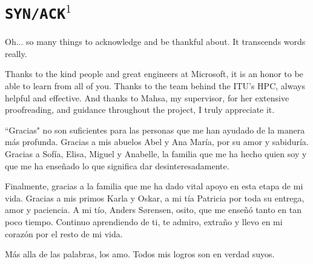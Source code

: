 \documentclass{thesis/resources/ituthesis}
\begin{document}
\frontmatter

\thetitlepage
\newpage
\chapter{\texttt{SYN/ACK}$^1$}

\parbox{0.8\textwidth}{
Oh... so many things to acknowledge and be thankful about. It transcends words really.

Thanks to the kind people and great engineers at Microsoft, it is an honor to be able to learn
from all of you. Thanks to the team behind the ITU's HPC, always helpful and effective. 
And thanks to Mahsa, my supervisor, for her extensive proofreading, and guidance throughout 
the project, I truly appreciate it. 
}

\vspace{3.5cm}

\parbox{\textwidth}{
    \begin{flushright}
``Gracias" no son suficientes para las personas que me han ayudado de la manera 
m\'as profunda. Gracias a mis abuelos Abel y Ana Mar\'ia, por su amor y sabidur\'ia.
Gracias a Sof\'ia, Elisa, Miguel y Anabelle, la familia que me ha hecho quien soy y 
que me ha ense\~nado lo que significa dar desinteresadamente. 

Finalmente, gracias a la familia que me ha dado vital apoyo en esta etapa de mi vida. Gracias a 
mis primos Karla y Oskar, a mi t\'ia Patricia por toda su entrega, amor y paciencia. A mi t\'io, Anders S\o{}rensen, 
osito, que me ense\~n\'o tanto en tan poco tiempo. Continuo aprendiendo de ti, te admiro, extra\~no 
y llevo en mi coraz\'on por el resto de mi vida.  

M\'as alla de las palabras, los amo. Todos mis logros son en verdad suyos.
    \end{flushright}
}
\end{document}
